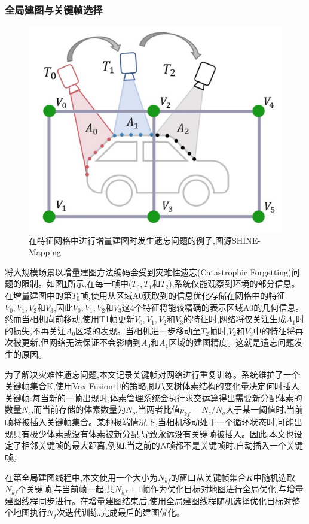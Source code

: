 \subsubsection{全局建图与关键帧选择}\label{forgettingsection}
\begin{figure}[htbp]
    \includegraphics[scale = 0.2]{figures/forgetting.jpg}
    \centering
    \caption{在特征网格中进行增量建图时发生遗忘问题的例子,图源SHINE-Mapping\cite{shine}} \label{forgetting}
\end{figure}
将大规模场景以增量建图方法编码会受到灾难性遗忘(Catastrophic Forgetting)问题的限制。如图\ref{forgetting}所示,在每一帧中($T_0, T_1$和$T_2$),系统仅能观察到环境的部分信息。在增量建图中的第$T_0$帧,使用从区域A0获取到的信息优化存储在网格中的特征$V_0, V_1, V_2$和$V_3$,因此$V_0, V_1, V_2$和$V_3$这4个特征将能较精确的表示区域A0的几何信息。然而当相机向前移动,使用T1帧更新$V_0, V_1, V_2$和$V_3$的特征时,网络将仅关注生成$A_1$时的损失,不再关注$A_0$区域的表现。当相机进一步移动至$T_2$帧时,$V_2$和$V_3$中的特征将再次被更新,但网络无法保证不会影响到$A_0$和$A_1$区域的建图精度。这就是遗忘问题发生的原因。

为了解决灾难性遗忘问题,本文记录关键帧对网络进行重复训练。系统维护了一个关键帧集合K,使用Vox-Fusion中的策略,即八叉树体素结构的变化量决定何时插入关键帧:每当新的一帧出现时,体素管理系统会执行求交运算得出需要新分配体素的数量$N_c$,而当前存储的体素数量为$N_o$,当两者比值$p_{kf}=N_c/N_o$大于某一阈值时,当前帧将被插入关键帧集合。某种极端情况下,当相机移动处于一个循环状态时,可能出现只有极少体素或没有体素被新分配,导致永远没有关键帧被插入。因此,本文也设定了相邻关键帧的最大距离,例如,当之前的$N$帧都不是关键帧时,自动插入一个关键帧。

在第全局建图线程中,本文使用一个大小为$N_{kf}$的窗口从关键帧集合$K$中随机选取$N_{kf}$个关键帧,与当前帧一起,共$N_{kf}+1$帧作为优化目标对地图进行全局优化,与增量建图线程同步进行。在增量建图结束后,使用全局建图线程随机选择优化目标对整个地图执行$N_f$次迭代训练,完成最后的建图优化。
